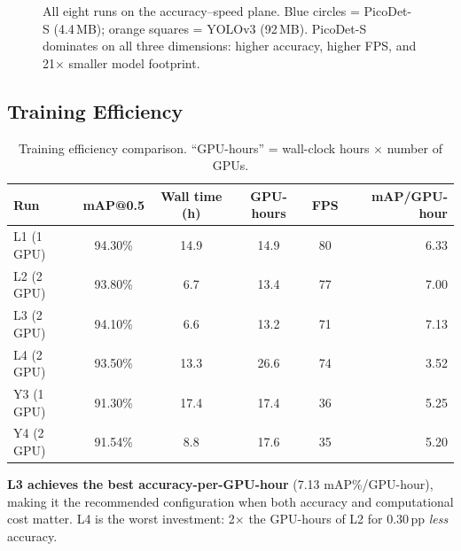 \begin{figure}[H]
\caption{All eight runs on the accuracy--speed plane.
  Blue circles = PicoDet-S (4.4\,MB); orange squares = YOLOv3 (92\,MB).
  PicoDet-S dominates on all three dimensions: higher accuracy, higher
  FPS, and 21$\times$ smaller model footprint.}
\label{fig:bubble}
\end{figure}

\subsection{Training Efficiency}

\begin{table}[H]
\centering
\caption{Training efficiency comparison.  ``GPU-hours'' = wall-clock
  hours $\times$ number of GPUs.}
\label{tab:efficiency}
\begin{tabular}{lccccr}
\toprule
\textbf{Run} & \textbf{mAP@0.5} & \textbf{Wall time (h)}
             & \textbf{GPU-hours} & \textbf{FPS}
             & \textbf{mAP/GPU-hour} \\
\midrule
L1 (1 GPU) & 94.30\% & 14.9 & 14.9 & 80 & 6.33 \\
L2 (2 GPU) & 93.80\% &  6.7 & 13.4 & 77 & 7.00 \\
L3 (2 GPU) & 94.10\% &  6.6 & 13.2 & 71 & 7.13 \\
L4 (2 GPU) & 93.50\% & 13.3 & 26.6 & 74 & 3.52 \\
\midrule
Y3 (1 GPU) & 91.30\% & 17.4 & 17.4 & 36 & 5.25 \\
Y4 (2 GPU) & 91.54\% &  8.8 & 17.6 & 35 & 5.20 \\
\bottomrule
\end{tabular}
\end{table}

\textbf{L3 achieves the best accuracy-per-GPU-hour} (7.13 mAP\%/GPU-hour),
making it the recommended configuration when both accuracy and
computational cost matter.  L4 is the worst investment: 2$\times$ the
GPU-hours of L2 for 0.30\,pp \emph{less} accuracy.
